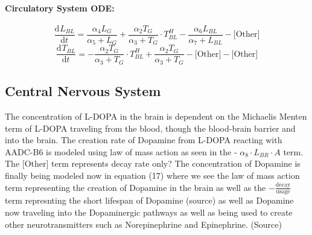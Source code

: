 \documentclass[smallextended]{svjour3}
\newcommand{\od}[3][]{\ensuremath{\frac{\mathrm{d}^{#1} {#2}}{\mathrm{d}{#3}^{#1}}}}
\begin{document}
\paragraph{Circulatory System ODE:}
\begin{equation}
\label{eq:14}
\od{L_{BL}}{t} = \frac{\alpha_4 L_G}{\alpha_5 + L_G} + \frac{\alpha_2 T_G}{\alpha_3 + T_G} \cdot T_{BL}^H - \frac{\alpha_6L_{BL}}{\alpha_7 +L_{BL}} -\text{[Other]}
\end{equation}
\begin{equation}
\label{eq:15}
\od{T_{BL}}{t} =  -\frac{\alpha_2 T_G}{\alpha_3 + T_G} \cdot T_{BL}^H + \frac{\alpha_2 T_G}{\alpha_3 + T_G} - \text{[Other]} - \text{[Other]}
\end{equation} %
\subsection{Central Nervous System}

The concentration of L-DOPA in the brain is dependent on the Michaelis Menten term of L-DOPA traveling from the blood, though the blood-brain barrier and into the brain. The creation rate of Dopamine from L-DOPA reacting with AADC-B6 is modeled using law of mass action as seen in the - $\alpha_8 \cdot L_{BR} \cdot A$ term. The [Other] term represents decay rate only? 
\quad The concentration of Dopamine is finally being modeled now in equation (17) where we see the law of mass action term representing the creation of Dopamine in the brain as well as the $- \frac{\text{decay}}{\text{usage}}$ term represnting the short lifespan of Dopamine (source) as well as Dopamine now traveling into the Dopaminergic pathways as well as being used to create other neurotransmitters such as Norepinephrine and Epinephrine. (Source) 
\end{document}

